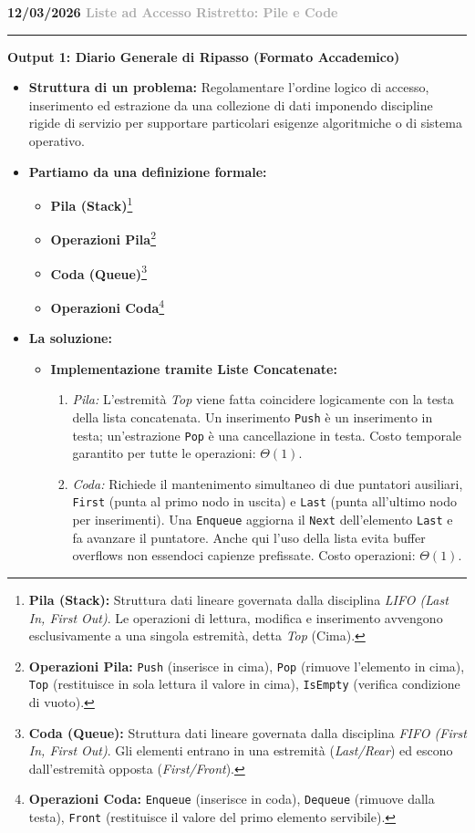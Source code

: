 \documentclass[a4paper, 11pt]{report}
\newcommand{\lezione}[2]{
\vspace{2em}
\noindent\textbf{\Large #1 \hfill \textcolor{darkgray}{#2}}
\vspace{0.5em}
\hrule
\vspace{1.5em}
}
\newcommand{\definizione}[2]{%
\textbf{#1}\footnote{\textbf{#1:} #2}%
}
\begin{document}
\lezione{12/03/2026}{Liste ad Accesso Ristretto: Pile e Code}
\vspace{0.5cm}
\textbf{Output 1: Diario Generale di Ripasso (Formato Accademico)}
\begin{itemize}
\item \textbf{Struttura di un problema:}
Regolamentare l'ordine logico di accesso, inserimento ed estrazione da una collezione di dati imponendo discipline rigide di servizio per supportare particolari esigenze algoritmiche o di sistema operativo.

\item \textbf{Partiamo da una definizione formale:}
\begin{itemize}
    \item \definizione{Pila (Stack)}{Struttura dati lineare governata dalla disciplina \textit{LIFO (Last In, First Out)}. Le operazioni di lettura, modifica e inserimento avvengono esclusivamente a una singola estremità, detta \textit{Top} (Cima).}
    \item \definizione{Operazioni Pila}{\texttt{Push} (inserisce in cima), \texttt{Pop} (rimuove l'elemento in cima), \texttt{Top} (restituisce in sola lettura il valore in cima), \texttt{IsEmpty} (verifica condizione di vuoto).}
    \item \definizione{Coda (Queue)}{Struttura dati lineare governata dalla disciplina \textit{FIFO (First In, First Out)}. Gli elementi entrano in una estremità (\textit{Last/Rear}) ed escono dall'estremità opposta (\textit{First/Front}).}
    \item \definizione{Operazioni Coda}{\texttt{Enqueue} (inserisce in coda), \texttt{Dequeue} (rimuove dalla testa), \texttt{Front} (restituisce il valore del primo elemento servibile).}
\end{itemize}

\item \textbf{La soluzione:}
\begin{itemize}
    \item \textbf{Implementazione tramite Liste Concatenate:}
    \begin{enumerate}
        \item \textit{Pila:} L'estremità \textit{Top} viene fatta coincidere logicamente con la testa della lista concatenata. Un inserimento \texttt{Push} è un inserimento in testa; un'estrazione \texttt{Pop} è una cancellazione in testa. Costo temporale garantito per tutte le operazioni: $\Theta(1)$.
        \item \textit{Coda:} Richiede il mantenimento simultaneo di due puntatori ausiliari, \texttt{First} (punta al primo nodo in uscita) e \texttt{Last} (punta all'ultimo nodo per inserimenti). Una \texttt{Enqueue} aggiorna il \texttt{Next} dell'elemento \texttt{Last} e fa avanzare il puntatore. Anche qui l'uso della lista evita buffer overflows non essendoci capienze prefissate. Costo operazioni: $\Theta(1)$.
    \end{enumerate}
\end{itemize}
\end{itemize}
\end{document}
